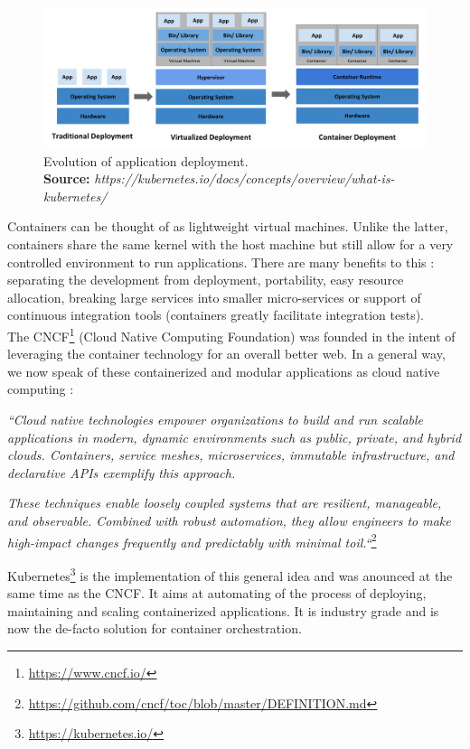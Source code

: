 \documentclass[12pt]{report}
\newcommand*{\captionsource}[2]{%
    \caption[{#1}]{%
        #1%
        \\\hspace{\linewidth}%
	\textbf{Source:} \textit{#2}%
    }%
}
\begin{document}
\begin{figure}[h]
	\centering
	\includegraphics[width=\textwidth]{../imgs/container_evolution.png}
	\captionsource{Evolution of application deployment.}{https://kubernetes.io/docs/concepts/overview/what-is-kubernetes/}
	\label{fig:container-evolution}
\end{figure}

Containers can be thought of as lightweight virtual machines. Unlike the
latter, containers share the same kernel with the host machine but still allow
for a very controlled environment to run applications. There are many
benefits to this : separating the development from deployment, portability,
easy resource allocation, breaking large services into smaller micro-services
or support of continuous integration tools (containers greatly facilitate
integration tests).\\

The CNCF\footnote{\url{https://www.cncf.io/}} (Cloud Native Computing
Foundation) was founded in the intent of leveraging the container technology
for an overall better web. In a general way, we now speak of these
containerized and modular applications as cloud native computing :

\textit{``Cloud native technologies empower organizations to build and run
	scalable applications in modern, dynamic environments such as public,
	private, and hybrid clouds. Containers, service meshes, microservices,
	immutable infrastructure, and declarative APIs exemplify this
	approach.}

\textit{These techniques enable loosely coupled systems that
	are resilient, manageable, and observable.  Combined with robust
	automation, they allow engineers to make high-impact changes frequently
	and predictably with minimal toil.``}\footnote{\url{https://github.com/cncf/toc/blob/master/DEFINITION.md}}

Kubernetes\footnote{\url{https://kubernetes.io/}} is the implementation of this
general idea and was anounced at the same time as the CNCF. It aims at
automating of the process of deploying, maintaining and scaling containerized
applications. It is industry grade and is now the de-facto solution for
container orchestration.
\end{document}
